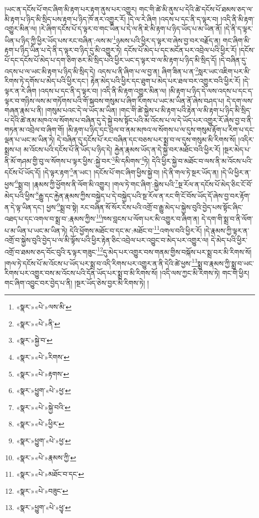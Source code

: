 །ཡང་ན་དངོས་པོ་གང་ཞིག་མི་རྟག་པར་རྟག་ནུས་པར་འགྱུར། གང་གི་ཚེ་མི་ནུས་པ་དེའི་ཚེ་དངོས་པོ་ཐམས་ཅད་ལ་མི་རྟག་པ་ཉིད་མི་སྲིད་པས་རྟག་པ་ཉིད་ཁོ་ནར་འགྱུར་རོ། །དེ་ལ་རེ་ཞིག །འདས་པ་དང་ནི་ད་ལྟར་བ། །འདི་ནི་མི་རྟག་འགྱུར་མིན་ལ། །རེ་ཞིག་དངོས་པོ་ད་ལྟར་བ་གང་ཡིན་པ་དེ་ལ་ནི་ཇེ་མི་རྟག་པ་ཉིད་ཡོད་པ་མ་ཡིན་ནོ། །དེ་ནི་ད་ལྟར་ཡིན་པ་ཉིད་ཀྱི་ཕྱིར་ཡོད་པས་རང་བཞིན་:ལས་མ་\footnote{«སྣར་»«པེ་»ལས་མི་}ཉམས་པའི་ཕྱིར་ད་ལྟར་བ་ཞེས་བྱ་བར་བརྗོད་ན། གང་ཞིག་མི་རྟག་པ་ཉིད་ཡིན་པ་དེ་ནི་ད་ལྟར་བ་ཉིད་དུ་མི་འགྱུར་ཏེ། དངོས་པོ་མེད་པ་དང་མངོན་པར་འབྲེལ་པའི་ཕྱིར་རོ། །དངོས་པོ་དང་དངོས་པོ་མེད་པ་དག་ཅིག་ཅར་མི་སྲིད་པའི་ཕྱིར་ཡང་ད་ལྟར་བ་ལ་མི་རྟག་པ་ཉིད་མི་སྲིད་དོ། །དེ་བཞིན་དུ་འདས་པ་ལ་ཡང་མི་རྟག་པ་ཉིད་མི་སྲིད་དེ། འདས་པ་ནི་ཞིག་པ་ལ་བྱ་ན། ཞིག་ཟིན་པ་ན་\footnote{«སྣར་»«པེ་»ནི་}སླར་ཡང་འཇིག་པར་མི་རིགས་ཏེ་དགོས་པ་མེད་པའི་ཕྱིར་དང་། རྟེན་མེད་པའི་ཕྱིར་དང་ཐུག་པ་མེད་པར་ཐལ་བར་འགྱུར་བའི་ཕྱིར་རོ། །དེ་ལྟར་ན་རེ་ཞིག །འདས་པ་དང་ནི་ད་ལྟར་བ། །འདི་ནི་མི་རྟག་འགྱུར་མིན་ལ། །མི་རྟག་པ་ཉིད་དེ་ལས་འདས་པ་དང་ད་ལྟར་བ་གཉིས་ལས་མ་གཏོགས་པའི་གོ་སྐབས་གསུམ་པ་ཞིག་རིགས་པ་ཡང་མ་ཡིན་ནོ་ཞེས་བཤད་པ། དེ་དག་ལས་གཞན་རྣམ་པ་ནི། །གསུམ་པའང་དེ་ལ་ཡོད་མ་ཡིན། །གང་གི་ཚེ་སྐྱེས་པ་མི་རྟག་པའི་རྟེན་ལ་མི་རྟག་པ་ཉིད་མི་སྲིད་པ་དེའི་ཚེ་ནམ་མཁའ་ལ་སོགས་པ་བཞིན་དུ་དེ་སྐྱེ་བས་སྟོང་པའི་མ་འོངས་པ་ལ་དེ་ཡོད་པར་འགྱུར་རོ་ཞེས་བྱ་བ་ནི་གཏན་མ་འབྲེལ་བ་ཞིག་གོ། །མི་རྟག་པ་ཉིད་དང་བྲལ་བ་ནམ་མཁའ་ལ་སོགས་པ་ལ་དུས་གསུམ་རྟོག་པ་རིག་པ་དང་ལྡན་པ་ཡང་མ་ཡིན་ཏེ། དེ་བཞིན་དུ་དངོས་པོ་རང་བཞིན་དང་བཅས་པར་སྨྲ་བ་ལ་དུས་གསུམ་མི་རིགས་སོ། །འདིར་སྨྲས་པ། མ་འོངས་པའི་དངོས་པོ་ནི་ཡོད་པ་ཉིད་དེ། རྐྱེན་རྣམས་ཡོད་ན་དེ་སྐྱེ་བར་མཐོང་བའི་ཕྱིར་རོ། །སྔར་མེད་པ་ནི་མོ་གཤམ་གྱི་བུ་ལ་སོགས་པ་ལྟར་ཕྱིས་:སྐྱེ་བར་\footnote{«སྣར་»སྐྱེ་བ་}མི་དམིགས་\footnote{«སྣར་»«པེ་»རིགས་}ཏེ། དེའི་ཕྱིར་སྐྱེ་བ་མཐོང་བ་ལས་ནི་མ་འོངས་པའི་དངོས་པོ་ཡོད་དོ། །དེ་ལྟར་རྟག་\footnote{«སྣར་»«པེ་»རྟགས་}ན་ཡང་། །དངོས་པོ་གང་ཞིག་ཕྱིས་སྐྱེ་བ། །དེ་ནི་གལ་ཏེ་སྔར་ཡོད་ན། །དེ་ཡི་ཕྱིར་ན་ཕྱས་\footnote{«སྣར་»ཕྱུག་«པེ་»ཕྱ་}སྨྲ་བ། །རྣམས་ཀྱི་ཕྱོགས་ནི་ལོག་མི་འགྱུར། །གལ་ཏེ་གང་ཞིག་:སྐྱེས་པའི་\footnote{«སྣར་»«པེ་»སྐྱེ་བའི་}སྔ་རོལ་ན་དངོས་པོ་མེད་ཅིང་ངོ་བོ་མེད་པའི་ཕྱིས་\footnote{«སྣར་»«པེ་»ཕྱིར་}རྒྱུ་དང་རྐྱེན་རྣམས་ཀྱིས་བསྐྱེད་པ་དེ་བསྐྱེད་པའི་སྔ་རོལ་ན་རང་གི་ངོ་བོས་ཡོད་དོ་ཞེས་བྱ་བར་རྟོག་ན་དེ་ལྟ་ཡིན་དང་། ཕྱས་\footnote{«སྣར་»ཕྱུག་«པེ་»ཕྱ་}སྨྲ་བ་སྟེ། རང་བཞིན་སོ་སོར་ངེས་པའི་འགྲོ་བ་རྒྱུ་མེད་པ་སྐྱེས་བུའི་བྱེད་པས་སྟོང་ཞིང་འཐད་པ་དང་འགལ་བ་སྨྲ་བ་:རྣམས་ཀྱིས་\footnote{«སྣར་»«པེ་»རྣམས་ཀྱི་}ཁས་བླངས་པ་ལོག་པར་མི་འགྱུར་བ་ཞིག་ན། དེ་དག་གི་སྨྲ་བ་ནི་ལོག་པ་མ་ཡིན་པ་ཡང་མ་ཡིན་ཏེ། དེའི་ཕྱོགས་མཐོང་བ་དང་མ་:མཐོང་བ་\footnote{«སྣར་»«པེ་»མཐོང་བ་དང་}འགལ་བའི་ཕྱིར་རོ། །དེ་རྣམས་ཀྱི་ལྟར་ན་འགྲོ་བ་སྐྱེས་བུའི་བྱེད་པ་ལ་མི་ལྟོས་པའི་ཕྱིར་རྟེན་ཅིང་འབྲེལ་པར་འབྱུང་བ་མེད་པར་འགྱུར་ལ། དེ་མེད་པའི་ཕྱིར་འགྲོ་བ་ཐམས་ཅད་བོང་བུའི་རྭ་ལྟར་གཟུང་\footnote{«སྣར་»«པེ་»བཟུང་}དུ་མེད་པར་འགྱུར་བས་གནམ་གྱིས་བསྐོས་པར་སྨྲ་བར་མི་རིགས་སོ། །གལ་ཏེ་དངོས་པོ་མ་འོངས་པ་ཡོད་པར་སྨྲ་བ་འདི་རིགས་པར་འགྱུར་ན་ནི་དེའི་ཚེ་ཕྱས་\footnote{«སྣར་»ཕྱུག་«པེ་»ཕྱྭ་}སྨྲ་བ་རྣམས་ཀྱི་སྨྲ་བ་ཡང་རིགས་པར་འགྱུར་བས་མ་འོངས་པའི་དོན་ཡོད་པར་སྨྲ་བ་མི་རིགས་སོ། །འདི་ལས་ཀྱང་མི་རིགས་ཏེ། གང་གི་ཕྱིར། གང་ཞིག་འབྱུང་བར་བྱེད་པ་ནི། །སྔར་ཡོད་ཅེས་བྱར་མི་རིགས་ཏེ། །
